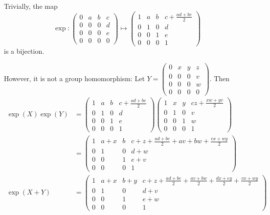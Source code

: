 \documentclass[12pt]{article}
\begin{document}
        Trivially, the map 
        \[\exp: \begin{pmatrix}
            0 & a & b & c\\
            0 & 0 & 0 & d\\
            0 & 0 & 0 & e\\
            0 & 0 & 0 & 0
        \end{pmatrix} \mapsto \begin{pmatrix}
            1 & a & b & c + \frac{ad + be}{2}\\ 
            0 & 1 & 0 & d\\
            0 & 0 & 1 & e\\
            0 & 0 & 0 & 1
        \end{pmatrix}\] 
        is a bijection. 

        However, it is not a group homomorphism: Let $Y  =\begin{pmatrix}
            0 & x & y & z\\
            0 & 0 & 0 & v\\
            0 & 0 & 0 & w\\
            0 & 0 & 0 & 0
        \end{pmatrix}$. Then
        \begin{align*}
            \exp(X)\exp(Y) &= \begin{pmatrix}
                1 & a & b & c + \frac{ad + be}{2}\\ 
                0 & 1 & 0 & d\\
                0 & 0 & 1 & e\\
                0 & 0 & 0 & 1
            \end{pmatrix}\begin{pmatrix}
                1 & x & y & cz+ \frac{xw + yv}{2}\\
                0 & 1 & 0 & v\\
                0 & 0 & 1 & w\\
                0 & 0 & 0 & 1
            \end{pmatrix}\\ 
            &= \begin{pmatrix}
                1 & a + x & b & c + z + \frac{ad + be}{2} + av + bw + \frac{vx + wy}{2}\\ 
                0 & 1 & 0 & d + w\\
                0 & 0 & 1 & e + v\\
                0 & 0 & 0 & 1
            \end{pmatrix}\\ 
            \exp(X + Y) &= \begin{pmatrix}
                1 & a + x & b + y & c + z + \frac{ad + be}{2} + \frac{av + bw}{2}+ \frac{dx + ey}{2} + \frac{vx + wy}{2}\\ 
                0 & 1 & 0 & d + v\\
                0 & 0 & 1 & e + w\\
                0 & 0 & 0 & 1 
            \end{pmatrix}
        \end{align*}
    
\end{document}
